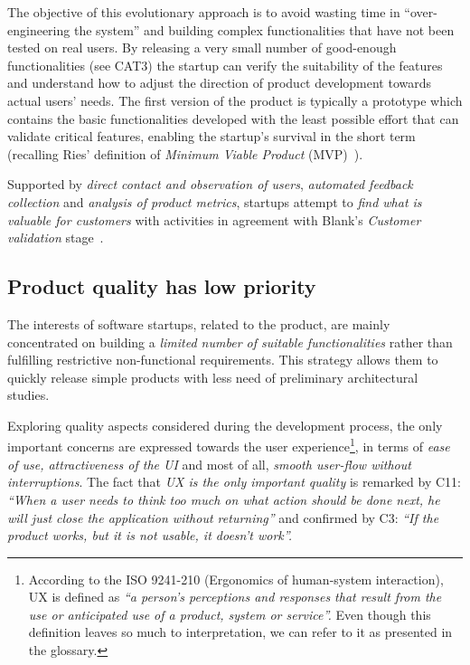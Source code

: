 \documentclass[10pt,journal,letterpaper,compsoc]{IEEEtran}
\begin{document}
The objective of this evolutionary approach is to avoid wasting time in ``over-
engineering the system'' and building complex functionalities that have not
been tested on real users. By releasing a very small number of good-enough
functionalities (see CAT3) the startup can verify the suitability of the
features and understand how to adjust the direction of product development
towards actual users' needs. The first version of the product is typically a
prototype which contains the basic functionalities developed with the least
possible effort that can validate critical features, enabling the startup's
survival in the short term (recalling Ries' definition of \textit{Minimum
Viable Product} (MVP)~\cite{Ries2011}).

Supported by \textit{direct contact and observation of users},
\textit{automated feedback collection} and \textit{analysis of product metrics},
startups attempt to \textit{find what is valuable for customers} with activities
in agreement with Blank's \textit{Customer validation} stage~\cite{Blank2005}.

\subsection{Product quality has low priority}\label{res:gsm:cat3}
The interests of software startups, related to the product, are mainly 
concentrated on building a \textit{limited number of suitable functionalities} 
rather than fulfilling restrictive non-functional requirements. This strategy 
allows them to quickly release simple products with less need of preliminary 
architectural studies.


Exploring quality aspects considered during the development process, the only
important concerns are expressed towards the user experience\footnote{According
to the ISO 9241-210 (Ergonomics of human-system interaction), UX is defined as
\textit{``a person's perceptions and responses that result from the use or
anticipated use of a product, system or service''.} Even though this definition
leaves so much to interpretation, we can refer to it as presented in the
glossary.}, in terms of \textit{ease of use, attractiveness of the UI} and most
of all, \textit{smooth user-flow without interruptions}. The fact that
\textit{UX is the only important quality} is remarked by C11: \textit{``When a
user needs to think too much on what action should be done next, he will just
close the application without returning''} and confirmed by C3: \textit{``If the
product works, but it is not usable, it doesn't work''.}
\end{document}
